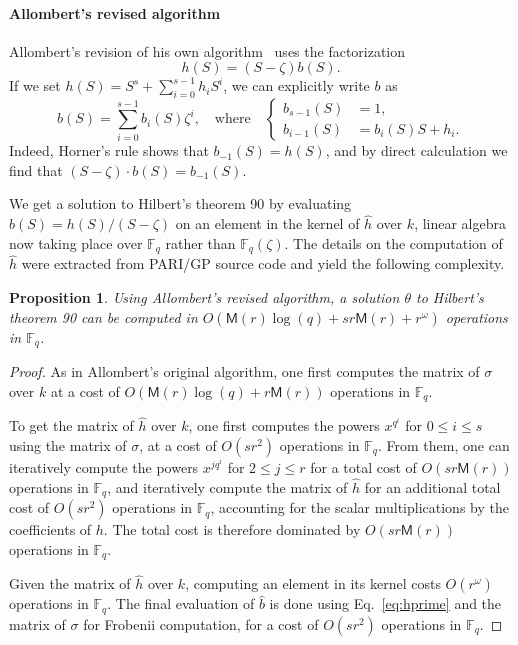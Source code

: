 \documentclass[12pt]{article}
\theoremstyle{plain}
\newtheorem{proposition}[theorem]{Proposition}
\theoremstyle{definition}
\def\F{\ensuremath{\mathbb{F}}}
\def\MM{\ensuremath{\mathsf{M}}}
\newcounter{algorithm}
\begin{document}
\paragraph{Allombert's revised algorithm}
Allombert's revision of his own algorithm~\cite{Allombert02-rev} uses
the factorization
$$h(S)=(S-\zeta) b(S).$$
If we set $h(S)=S^s+\sum_{i=0}^{s-1}h_iS^i$, we can
explicitly write $b$ as
\begin{equation}
  \label{eq:hprime}
  b(S)=\sum_{i=0}^{s-1}b_i(S)\zeta^i,\quad
  \text{where}\quad
  \left\{\begin{aligned}
    b_{s-1}(S) &= 1,\\
    b_{i-1}(S) &= b_i(S) S + h_i.
  \end{aligned}\right.
\end{equation}
Indeed, Horner's rule shows that $b_{-1}(S)=h(S)$, and by direct
calculation we find that $(S-\zeta)\cdot b(S) = b_{-1}(S)$.

We get a solution to Hilbert's theorem 90 by evaluating
$b(S)=h(S)/(S-\zeta)$ on an element in the kernel of $\hat{h}$ over
$k$, linear algebra now taking place over $\F_q$ rather than
$\F_q(\zeta)$. The details on the computation of $\hat{h}$ were
extracted from PARI/GP source code and yield the following complexity.

\begin{proposition}
  Using Allombert's revised algorithm, a solution $\theta$ to
  Hilbert's theorem 90 can be computed in $O(\MM(r) \log(q) + s r
  \MM(r) + r^\omega)$ operations in $\F_q$.
\end{proposition}

\begin{proof}
As in Allombert's original algorithm, one first
computes the matrix of $\sigma$ over $k$ at a cost of
$O(\MM(r) \log(q) + r \MM(r))$ operations in $\F_q$.


To get the matrix of $\hat{h}$ over $k$, one first computes the powers
$x^{q^i}$ for $0 \leq i \leq s$ using the matrix of $\sigma$, at a
cost of $O(s r^2)$ operations in $\F_q$.  From them, one can
iteratively compute the powers $x^{j q^i}$ for $2 \leq j \leq r$ for a
total cost of $O(s r \MM(r))$ operations in $\F_q$, and iteratively
compute the matrix of $\hat{h}$ for an additional total cost of $O(s
r^2)$ operations in $\F_q$, accounting for the scalar multiplications
by the coefficients of $h$.  The total cost is therefore dominated by
$O(s r \MM(r))$ operations in $\F_q$.

Given the matrix of $\hat{h}$ over $k$, computing an element in its
kernel costs $O(r^\omega)$ operations in $\F_q$.  The final evaluation
of $\hat{b}$ is done using Eq.~\eqref{eq:hprime} and the matrix of
$\sigma$ for Frobenii computation, for a cost of $O(s r^2)$ operations
in $\F_q$.
\end{proof}
\end{document}
